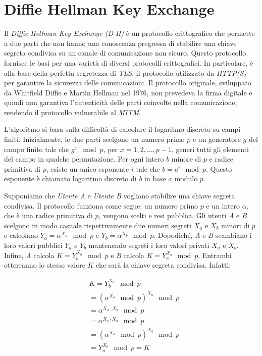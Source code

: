 \section{Diffie Hellman Key Exchange}
Il \emph{Diffie-Hellman Key Exchange (D-H)} è un protocollo crittografico che permette a due parti che non hanno una conoscenza pregressa di stabilire una chiave segreta condivisa su un canale di comunicazione non sicuro.
Questo protocollo fornisce le basi per una varietà di diversi protocolli crittografici. In particolare, è alla base della perfetta segretezza di \emph{TLS}, il protocollo utilizzato da \emph{HTTP(S)} per garantire la sicurezza delle comunicazioni.
Il protocollo originale, sviluppato da Whitfield Diffie e Martin Hellman nel 1976, non prevedeva la firma digitale e quindi non garantiva l'autenticità delle parti coinvolte nella comunicazione, rendendo il protocollo vulnerabile al \emph{\gls{MITM}}.

L'algoritmo si basa sulla difficoltà di calcolare il logaritmo discreto su campi finiti.
Inizialmente, le due parti scelgono un numero primo $p$ e un generatore $g$ del campo finito tale che $g^x \mod p$, per $x = 1, 2, ..., p-1$, generi tutti gli elementi del campo in qualche permutazione.
Per ogni intero $b$ minore di $p$ e radice primitiva di $p$, esiste un unico esponente $i$ tale che $b = a^i \mod p$. Questo esponente è chiamato logaritmo discreto di $b$ in base $a$ modulo $p$.

Supponiamo che \emph{Utente A} e \emph{Utente B} vogliano stabilire una chiave segreta condivisa. Il protocollo funziona come segue:
un numero primo $p$ e un intero $\alpha$, che è una radice primitiva di $p$, vengono scelti e resi pubblici. Gli utenti \emph{A} e \emph{B} scelgono in modo casuale rispettivamente due numeri segreti $X_a$ e $X_b$ minori di $p$ e calcolano $Y_a = \alpha^{X_a} \mod p$ e $Y_b = \alpha^{X_b} \mod p$.
Dopodiché, \emph{A} e \emph{B} scambiano i loro valori pubblici $Y_a$ e $Y_b$ mantenendo segreti i loro valori privati $X_a$ e $X_b$.
Infine, \emph{A} calcola $K = Y_b^{X_a} \mod p$ e \emph{B} calcola $K = Y_a^{X_b} \mod p$. Entrambi otterranno lo stesso valore $K$ che sarà la chiave segreta condivisa.
Infatti:

\begin{equation}
	\begin{aligned}
		&K = Y_b^{X_a} \mod p \\
		&= (\alpha^{X_b} \mod p)^{X_a} \mod p \\
		&= \alpha^{X_a \cdot X_b} \mod p \\
		&= \alpha^{X_b \cdot X_a} \mod p \\
		&= (\alpha^{X_a} \mod p)^{X_b} \mod p \\
		&= Y_a^{X_b} \mod p = K
	\end{aligned}
\end{equation}

